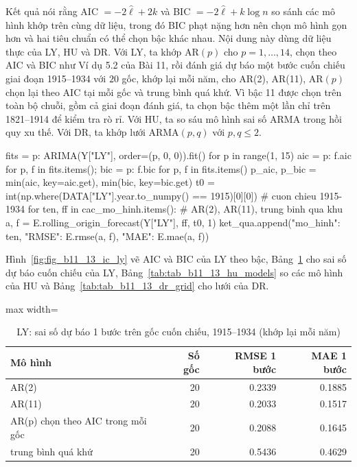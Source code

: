  Kết quả  nói rằng AIC $=-2\hat\ell+2k$ và BIC $=-2\hat\ell+k\log n$ so sánh các mô hình khớp trên cùng dữ liệu, trong đó BIC phạt nặng hơn nên chọn mô hình gọn hơn và hai tiêu chuẩn có thể chọn bậc khác nhau.
 Nội dung này dùng dữ liệu thực của LY, HU và DR. Với LY, ta khớp AR$(p)$ cho $p=1,\dots,14$, chọn theo AIC và BIC như Ví dụ 5.2 của Bài 11, rồi đánh giá dự báo một bước cuốn chiếu giai đoạn 1915--1934 với $20$ gốc, khớp lại mỗi năm, cho AR(2), AR(11), AR$(p)$ chọn lại theo AIC tại mỗi gốc và trung bình quá khứ. Vì bậc 11 được chọn trên toàn bộ chuỗi, gồm cả giai đoạn đánh giá, ta chọn bậc thêm một lần chỉ trên 1821--1914 để kiểm tra rò rỉ. Với HU, ta so sáu mô hình sai số ARMA trong hồi quy xu thế. Với DR, ta khớp lưới ARMA$(p,q)$ với $p,q\le2$.
\begin{codeblock}
fits = {p: ARIMA(Y["LY"], order=(p, 0, 0)).fit() for p in range(1, 15)}
aic = {p: f.aic for p, f in fits.items()}; bic = {p: f.bic for p, f in fits.items()}
p_aic, p_bic = min(aic, key=aic.get), min(bic, key=bic.get)
t0 = int(np.where(DATA["LY"].year.to_numpy() == 1915)[0][0])      # cuon chieu 1915-1934
for ten, ff in cac_mo_hinh.items():           # AR(2), AR(11), trung binh qua khu
    a, f = E.rolling_origin_forecast(Y["LY"], ff, t0, 1)
    ket_qua.append({"mo_hinh": ten, "RMSE": E.rmse(a, f), "MAE": E.mae(a, f)})
\end{codeblock}
 Hình~\ref{fig:fig_b11_13_ic_ly} vẽ AIC và BIC của LY theo bậc, Bảng~\ref{tab:tab_b11_13_ly_rolling} cho sai số dự báo cuốn chiếu của LY, Bảng~\ref{tab:tab_b11_13_hu_models} so các mô hình của HU và Bảng~\ref{tab:tab_b11_13_dr_grid} cho lưới của DR.
\begin{table}[H]
\centering\footnotesize
\caption{LY: sai số dự báo 1 bước trên gốc cuốn chiếu, 1915--1934 (khớp lại mỗi năm)}\label{tab:tab_b11_13_ly_rolling}
\begin{adjustbox}{max width=\linewidth}
\begin{tabular}{|>{\raggedright\arraybackslash}p{}|r|r|r|}
\toprule
Mô hình & Số gốc & RMSE 1 bước & MAE 1 bước \\
\midrule
AR(2) & 20 & 0.2339 & 0.1885 \\[3pt]
AR(11) & 20 & 0.2033 & 0.1517 \\[3pt]
AR(p) chọn theo AIC trong mỗi gốc & 20 & 0.2088 & 0.1645 \\[3pt]
trung bình quá khứ & 20 & 0.5436 & 0.4629 \\[3pt]
\bottomrule
\end{tabular}
\end{adjustbox}\par{}
\end{table}
